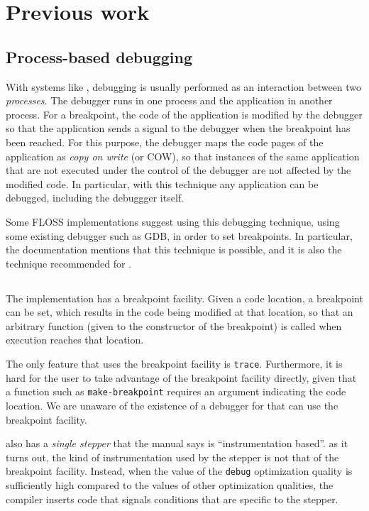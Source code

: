 \section{Previous work}

\subsection{Process-based debugging}

With systems like \unix{}, debugging is usually performed as an
interaction between two \emph{processes}.  The debugger runs in one
process and the application in another process.  For a breakpoint, the
code of the application is modified by the debugger so that the
application sends a signal to the debugger when the breakpoint has
been reached.  For this purpose, the debugger maps the code pages of
the application as \emph{copy on write} (or COW), so that instances of
the same application that are not executed under the control of the
debugger are not affected by the modified code.  In particular, with
this technique any application can be debugged, including the
debuggger itself.

Some FLOSS \commonlisp{} implementations suggest using this debugging
technique, using some existing debugger such as GDB, in order to set
breakpoints.  In particular, the \ccl{} documentation mentions that
this technique is possible, and it is also the technique recommended
for \ecl{}.

\subsection{\sbcl{}}

The \sbcl{} \commonlisp{} implementation has a breakpoint facility.
Given a code location, a breakpoint can be set, which results in the
code being modified at that location, so that an arbitrary function
(given to the constructor of the breakpoint) is called when execution
reaches that location.

The only feature that uses the breakpoint facility is \texttt{trace}.
Furthermore, it is hard for the user to take advantage of the
breakpoint facility directly, given that a function such as
\texttt{make-breakpoint} requires an argument indicating the code
location.  We are unaware of the existence of a debugger for \sbcl{}
that can use the breakpoint facility.

\sbcl{} also has a \emph{single stepper} that the manual says is
``instrumentation based''.  as it turns out, the kind of
instrumentation used by the stepper is not that of the breakpoint
facility.  Instead, when the value of the \texttt{debug} optimization
quality is sufficiently high compared to the values of other
optimization qualities, the compiler inserts code that signals
conditions that are specific to the stepper.

